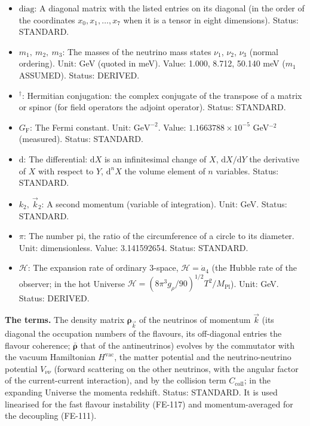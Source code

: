 \documentclass[
  10pt,
]{article}
\begin{document}
\begin{itemize}
  Value: \(\sin^2\theta_{12} = 0.308\), \(\sin^2\theta_{13} = 0.02215\),
  \(\sin^2\theta_{23} = 0.470\), \(\delta_{\mathrm{CP}} = 212^\circ\)
  (NuFIT 6.0). Status: STANDARD.
\item
  \(\mathrm{diag}\): A diagonal matrix with the listed entries on its
  diagonal (in the order of the coordinates \(x_0, x_1, \dots, x_7\)
  when it is a tensor in eight dimensions). Status: STANDARD.
\item
  \(m_1,\ m_2,\ m_3\): The masses of the neutrino mass states \(\nu_1\),
  \(\nu_2\), \(\nu_3\) (normal ordering). Unit: GeV (quoted in meV).
  Value: 1.000, 8.712, 50.140 meV (\(m_1\) ASSUMED). Status: DERIVED.
\item
  \({}^\dagger\): Hermitian conjugation: the complex conjugate of the
  transpose of a matrix or spinor (for field operators the adjoint
  operator). Status: STANDARD.
\item
  \(G_{\mathrm{F}}\): The Fermi constant. Unit: \(\mathrm{GeV}^{-2}\).
  Value: \(1.1663788\times10^{-5}\) GeV\(^{-2}\) (measured). Status:
  STANDARD.
\item
  \(\mathrm{d}\): The differential: \(\mathrm{d}X\) is an infinitesimal
  change of \(X\), \(\mathrm{d}X/\mathrm{d}Y\) the derivative of \(X\)
  with respect to \(Y\), \(\mathrm{d}^nX\) the volume element of \(n\)
  variables. Status: STANDARD.
\item
  \(k_2,\ \vec k_2\): A second momentum (variable of integration). Unit:
  GeV. Status: STANDARD.
\item
  \(\pi\): The number pi, the ratio of the circumference of a circle to
  its diameter. Unit: dimensionless. Value: 3.141592654. Status:
  STANDARD.
\item
  \(\mathcal{H}\): The expansion rate of ordinary 3-space,
  \(\mathcal{H} = \dot a_4\) (the Hubble rate of the observer; in the
  hot Universe
  \(\mathcal{H} = (8\pi^3g_\rho/90)^{1/2}T^2/M_{\mathrm{Pl}}\)). Unit:
  GeV. Status: DERIVED.
\end{itemize}

\textbf{The terms.} The density matrix \(\boldsymbol{\rho}_{\vec k}\) of
the neutrinos of momentum \(\vec k\) (its diagonal the occupation
numbers of the flavours, its off-diagonal entries the flavour coherence;
\(\bar{\boldsymbol{\rho}}\) that of the antineutrinos) evolves by the
commutator with the vacuum Hamiltonian \(H^{\mathrm{vac}}\), the matter
potential and the neutrino-neutrino potential \(V_{\nu\nu}\) (forward
scattering on the other neutrinos, with the angular factor of the
current-current interaction), and by the collision term
\(C_{\mathrm{coll}}\); in the expanding Universe the momenta redshift.
Status: STANDARD. It is used linearised for the fast flavour instability
(FE-117) and momentum-averaged for the decoupling (FE-111).
\end{document}
